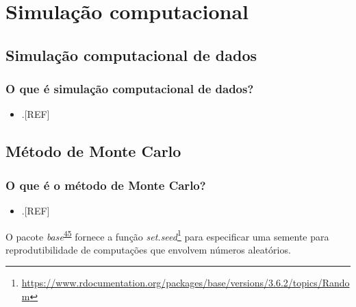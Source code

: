 \documentclass[
  a4paper,
]{book}
\providecommand{\tightlist}{%
  \setlength{\itemsep}{0pt}\setlength{\parskip}{0pt}}
\renewcommand{\href}[2]{#2\footnote{\url{#1}}}
\newenvironment{infobox}[1]
  {
  \begin{itemize}
  \renewcommand{\labelitemi}{
    \raisebox{-.7\height}[0pt][0pt]{
      {\setkeys{Gin}{width=3em,keepaspectratio}
        \texttt{[image: \#1]}}
    }
  }
  \setlength{\fboxsep}{1em}
  \begin{blackbox}
  \item
  }
  {
  \end{blackbox}
  \end{itemize}
  }
\begin{document}
\hypertarget{simulacao-computacional}{%
\chapter{\texorpdfstring{\textbf{Simulação computacional}}{Simulação computacional}}\label{simulacao-computacional}}

\hypertarget{simulacao-computacional-dados}{%
\section{Simulação computacional de dados}\label{simulacao-computacional-dados}}

\hypertarget{o-que-uxe9-simulauxe7uxe3o-computacional-de-dados}{%
\subsection{O que é simulação computacional de dados?}\label{o-que-uxe9-simulauxe7uxe3o-computacional-de-dados}}

\begin{itemize}
\tightlist
\item
  .{[}REF{]}
\end{itemize}

\hypertarget{monte-carlo}{%
\section{Método de Monte Carlo}\label{monte-carlo}}

\hypertarget{o-que-uxe9-o-muxe9todo-de-monte-carlo}{%
\subsection{O que é o método de Monte Carlo?}\label{o-que-uxe9-o-muxe9todo-de-monte-carlo}}

\begin{itemize}
\tightlist
\item
  .{[}REF{]}
\end{itemize}

\begin{infobox}{images/Rlogo}
O pacote \emph{base}\textsuperscript{\protect\hyperlink{ref-base-5}{45}} fornece a função \href{https://www.rdocumentation.org/packages/base/versions/3.6.2/topics/Random}{\emph{set.seed}} para especificar uma semente para reprodutibilidade de computações que envolvem números aleatórios.

\end{infobox}
\end{document}
